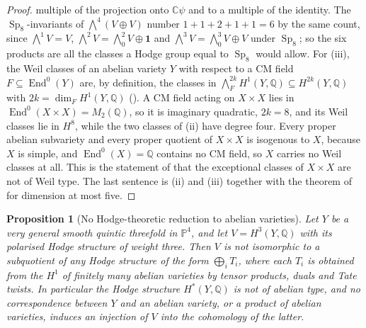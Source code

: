 \documentclass[11pt,reqno]{amsart}
\theoremstyle{plain}
\newtheorem{proposition}[theorem]{Proposition}
\theoremstyle{definition}
\theoremstyle{remark}
\newcommand{\QQ}{\mathbb{Q}}
\newcommand{\CC}{\mathbb{C}}
\newcommand{\PP}{\mathbb{P}}
\DeclareMathOperator{\End}{End}
\DeclareMathOperator{\Sp}{Sp}
\begin{document}
\begin{proof}
multiple of the projection onto $\CC\psi$ and to a multiple of the
identity. The $\Sp_{8}$-invariants of $\bigwedge^{4}(V\oplus V)$ number
$1+1+2+1+1=6$ by the same count, since $\bigwedge^{1}V=V$,
$\bigwedge^{2}V=\bigwedge^{2}_{0}V\oplus\mathbf{1}$ and
$\bigwedge^{3}V=\bigwedge^{3}_{0}V\oplus V$ under $\Sp_{8}$; so the six
products are all the classes a Hodge group equal to $\Sp_{8}$ would allow. For (iii), the Weil classes of an abelian
variety $Y$ with respect to a CM field $F\subseteq\End^{0}(Y)$ are, by
definition, the classes in $\bigwedge^{2k}_{F}H^{1}(Y,\QQ)\subseteq
H^{2k}(Y,\QQ)$ with $2k=\dim_{F}H^{1}(Y,\QQ)$ (\cite[Setup~17.1]{paperI}). A CM
field acting on $X\times X$ lies in $\End^{0}(X\times X)=M_{2}(\QQ)$, so it is
imaginary quadratic, $2k=8$, and its Weil classes lie in $H^{8}$, while the two
classes of (ii) have degree four. Every proper
abelian subvariety and every proper quotient of $X\times X$ is isogenous to
$X$, because $X$ is simple, and $\End^{0}(X)=\QQ$ contains no CM field, so $X$
carries no Weil classes at all. This is the statement of \cite[0.1(iii)]{MZ99}
that the exceptional classes of $X\times X$ are not of Weil type. The last
sentence is (ii) and (iii) together with the theorem of \cite{MZ99} for
dimension at most five.
\end{proof}

\begin{proposition}[No Hodge-theoretic reduction to abelian varieties]
\label{prop:noabeliantype}
Let $Y$ be a very general smooth quintic threefold in $\PP^{4}$, and let
$V=H^{3}(Y,\QQ)$ with its polarised Hodge structure of weight three. Then $V$
is not isomorphic to a subquotient of any Hodge structure of the form
$\bigoplus_{i}T_{i}$, where each $T_{i}$ is obtained from the $H^{1}$ of
finitely many abelian varieties by tensor products, duals and Tate twists. In
particular the Hodge structure $H^{*}(Y,\QQ)$ is not of abelian type, and no
correspondence between $Y$ and an abelian variety, or a product of abelian
varieties, induces an injection of $V$ into the cohomology of the latter.
\end{proposition}
\end{document}
